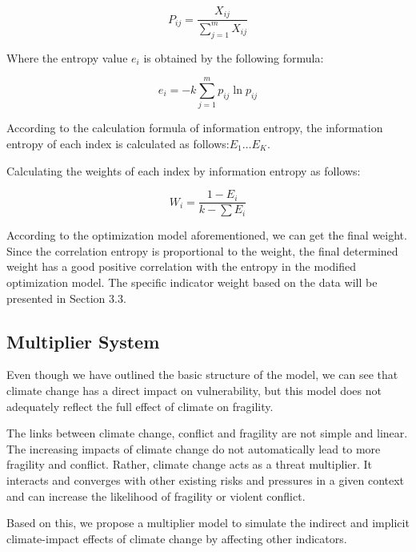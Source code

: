\documentclass{mcmthesis}
\begin{document}
			
			\begin{equation}
				P _ { i j } = \frac { X _ { i j } } { \sum _ { j = 1 } ^ { m } X _ { i j } }
			\end{equation}
			
			Where the entropy value $e_i$ is obtained by the following formula:
			
			\begin{equation}
				e _ { i } = - k \sum _ { j = 1 } ^ { m } p _ { i j } \ln p _ { i j }
			\end{equation}
			
			According to the calculation formula of information entropy, the information entropy of each index is calculated as follows:$E_1 \ldots E_K$. 
			
			Calculating the weights of each index by information entropy as follows:
			
			
			\begin{equation}
				W _ { i } = \frac { 1 - E _ { i } } { k - \sum E _ { i } }
			\end{equation}
			
			According to the optimization model aforementioned, we can get the final weight. Since the correlation entropy is proportional to the weight, the final determined weight has a good positive correlation with the entropy in the modified optimization model.
			The specific indicator weight based on the data will be presented in Section 3.3.
		
									
			
		\subsection{Multiplier System}
		
			Even though we have outlined the basic structure of the model, we can see that climate change has a direct impact on vulnerability, but this model does not adequately reflect the full effect of climate on fragility.
		
			The links between climate change, conflict and fragility are not simple and linear. The increasing impacts of climate change do not automatically lead to more fragility and conflict. Rather, climate change acts as a threat multiplier. It interacts and converges with other existing risks and pressures in a given context and can increase the likelihood of fragility or violent conflict.
			
			Based on this, we propose a multiplier model to simulate the indirect and implicit climate-impact effects of climate change by affecting other indicators.
			
\end{document}
